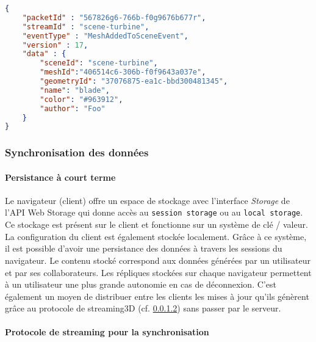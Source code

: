 \begin{lstlisting}[language=json,firstnumber=1,label=jsonstore,caption=Format
du Message transitant sur le réseau contenant l'événement MeshAddedToScene 
et ses 
paramètres]
{
	"packetId" : "567826g6-766b-f0g9676b677r",
	"streamId" : "scene-turbine",
	"eventType" : "MeshAddedToSceneEvent",
	"version" : 17,
	"data" : {
		"sceneId": "scene-turbine",
		"meshId":"406514c6-306b-f0f9643a037e",
		"geometryId": "37076875-ea1c-bbd300481345",
		"name": "blade",
		"color": "#963912",
		"author": "Foo"
	}
}
\end{lstlisting}


\subsubsection{Synchronisation des données}
\paragraph{Persistance à court terme}
Le navigateur (client) offre un espace de stockage avec l'interface \textit{Storage} 
de l'API Web Storage qui donne accès au \texttt{session storage} ou au  
\texttt{local storage}. Ce stockage est présent sur le client et fonctionne sur un 
système de clé / valeur. La configuration du client est également 
stockée localement. Grâce à ce système, il est possible d'avoir une 
persistance des données à travers les sessions du navigateur. Le contenu stocké 
correspond aux données générées par un utilisateur et par ses collaborateurs. Les 
répliques stockées sur chaque navigateur permettent à un utilisateur une plus 
grande 
autonomie en cas de déconnexion. C'est également un moyen de distribuer entre 
les clients les 
mises à jour qu'ils génèrent grâce au protocole de 
\gls{streaming3D} (cf. \ref{streamingprotocol}) sans passer par le serveur.

\paragraph{Protocole de streaming pour la synchronisation}
\label{streamingprotocol}

